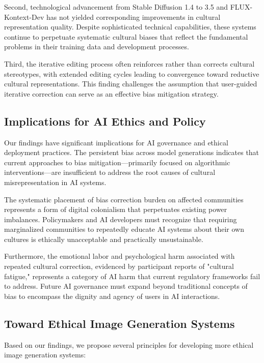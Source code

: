 \documentclass{article}
\begin{document}
Second, technological advancement from Stable Diffusion 1.4 to 3.5 and FLUX-Kontext-Dev has not yielded corresponding improvements in cultural representation quality. Despite sophisticated technical capabilities, these systems continue to perpetuate systematic cultural biases that reflect the fundamental problems in their training data and development processes.

Third, the iterative editing process often reinforces rather than corrects cultural stereotypes, with extended editing cycles leading to convergence toward reductive cultural representations. This finding challenges the assumption that user-guided iterative correction can serve as an effective bias mitigation strategy.

\subsection{Implications for AI Ethics and Policy}

Our findings have significant implications for AI governance and ethical deployment practices. The persistent bias across model generations indicates that current approaches to bias mitigation—primarily focused on algorithmic interventions—are insufficient to address the root causes of cultural misrepresentation in AI systems.

The systematic placement of bias correction burden on affected communities represents a form of digital colonialism that perpetuates existing power imbalances. Policymakers and AI developers must recognize that requiring marginalized communities to repeatedly educate AI systems about their own cultures is ethically unacceptable and practically unsustainable.

Furthermore, the emotional labor and psychological harm associated with repeated cultural correction, evidenced by participant reports of "cultural fatigue," represents a category of AI harm that current regulatory frameworks fail to address. Future AI governance must expand beyond traditional concepts of bias to encompass the dignity and agency of users in AI interactions.

\subsection{Toward Ethical Image Generation Systems}

Based on our findings, we propose several principles for developing more ethical image generation systems:
\end{document}
